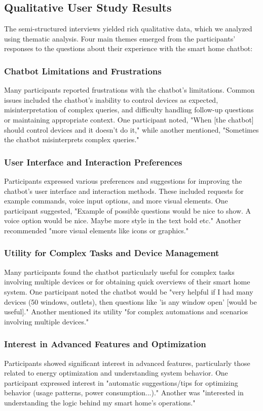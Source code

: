 \subsection{Qualitative User Study Results}
The semi-structured interviews yielded rich qualitative data, which we analyzed using thematic analysis. Four main themes emerged from the participants' responses to the questions about their experience with the smart home chatbot:
\subsubsection{Chatbot Limitations and Frustrations}
Many participants reported frustrations with the chatbot's limitations. Common issues included the chatbot's inability to control devices as expected, misinterpretation of complex queries, and difficulty handling follow-up questions or maintaining appropriate context. One participant noted, "When [the chatbot] should control devices and it doesn't do it," while another mentioned, "Sometimes the chatbot misinterprets complex queries."
\subsubsection{User Interface and Interaction Preferences}
Participants expressed various preferences and suggestions for improving the chatbot's user interface and interaction methods. These included requests for example commands, voice input options, and more visual elements. One participant suggested, "Example of possible questions would be nice to show. A voice option would be nice. Maybe more style in the text bold etc." Another recommended "more visual elements like icons or graphics."
\subsubsection{Utility for Complex Tasks and Device Management}
Many participants found the chatbot particularly useful for complex tasks involving multiple devices or for obtaining quick overviews of their smart home system. One participant noted the chatbot would be "very helpful if I had many devices (50 windows, outlets), then questions like 'is any window open' [would be useful]." Another mentioned its utility "for complex automations and scenarios involving multiple devices."
\subsubsection{Interest in Advanced Features and Optimization}
Participants showed significant interest in advanced features, particularly those related to energy optimization and understanding system behavior. One participant expressed interest in "automatic suggestions/tips for optimizing behavior (usage patterns, power consumption...)." Another was "interested in understanding the logic behind my smart home's operations."


